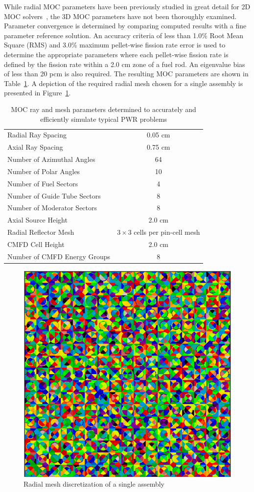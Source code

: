 \documentclass[12pt,twoside]{mitthesis-exec}
\begin{document}
While radial MOC parameters have been previously studied in great detail for 2D MOC solvers~\cite{rhodes2006casmo}, the 3D MOC parameters have not been thoroughly examined. Parameter convergence is determined by comparing computed results with a fine parameter reference solution. An accuracy criteria of less than 1.0\% Root Mean Square (RMS) and 3.0\% maximum pellet-wise fission rate error is used to determine the appropriate parameters where each pellet-wise fission rate is defined by the fission rate within a 2.0 cm zone of a fuel rod. An eigenvalue bias of less than 20 pcm is also required. The resulting MOC parameters are shown in Table~\ref{tab:final-params}. A depiction of the required radial mesh chosen for a single assembly is presented in Figure~\ref{fig:assembly-mesh}.

\begin{table}[ht]
	\centering
	\caption{MOC ray and mesh parameters determined to accurately and efficiently simulate typical PWR problems}
	\medskip
	\begin{tabular}{lc}
		\hline
		Radial Ray Spacing & 0.05 cm \\
		Axial Ray Spacing & 0.75 cm \\
		Number of Azimuthal Angles & 64 \\
		Number of Polar Angles & 10 \\
		\hline
		Number of Fuel Sectors & 4 \\
		Number of Guide Tube Sectors & 8 \\
		Number of Moderator Sectors & 8 \\
		Axial Source Height & 2.0 cm \\
		Radial Reflector Mesh & $3\times 3$ cells per pin-cell mesh \\
		\hline
		CMFD Cell Height & 2.0 cm \\
		Number of CMFD Energy Groups & 8 \\
		\hline
	\end{tabular}
	\label{tab:final-params}
\end{table}
		
\begin{figure}[ht!]
	\centering
	\includegraphics[width=0.7\linewidth]{figures/moc_mesh.PNG}
	\caption{Radial mesh discretization of a single assembly}
	\label{fig:assembly-mesh}
\end{figure}
\end{document}
